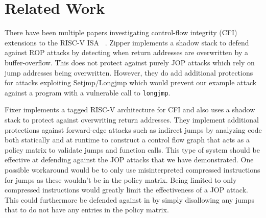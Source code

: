 \section{Related Work}
There have been multiple papers investigating control-flow integrity (CFI) 
extensions to the RISC-V ISA ~\cite{zipper,fixer}. Zipper \cite{zipper}
implements a shadow stack to defend against ROP attacks by detecting when return
addresses are overwritten by a buffer-overflow. This does not protect against
purely JOP attacks which rely on jump addresses being overwritten. However, they
do add additional protections for attacks exploiting Setjmp/Longjmp which would
prevent our example attack against a program with a vulnerable call to 
\verb|longjmp|.

Fixer \cite{fixer} implements a tagged RISC-V architecture for CFI and also 
uses a shadow stack to protect against overwriting return addresses. They 
implement additional protections against forward-edge attacks such as indirect
jumps by analyzing code both statically and at runtime to construct a control
flow graph that acts as a policy matrix to validate jumps and function calls.
This type of system should be effective at defending against the JOP attacks
that we have demonstrated. One possible workaround would be to only use
misinterpreted compressed instructions for jumps as these wouldn't be in the
policy matrix. Being limited to only compressed instructions would greatly limit
the effectiveness of a JOP attack. This could furthermore be defended against
in by simply disallowing any jumps that to do not have any entries in the policy
matrix.
